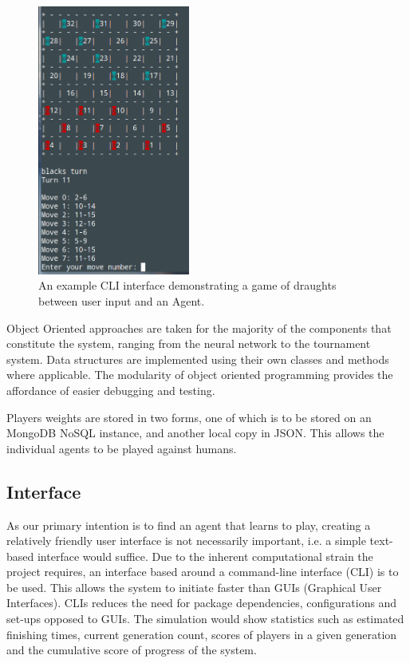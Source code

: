 \documentclass[12pt,a4paper]{article}
\begin{document}
    \begin{figure}
            \vspace{-30pt}
            \centering
            \caption{An example CLI interface demonstrating a game of draughts between user input and an Agent. \label{cli_human_input}}
            \includegraphics[width=50mm]{cli_humanvsagent.png}
            \vspace{-20pt}
        \end{figure}

    Object Oriented approaches are taken for the majority of the components that constitute the system, ranging from the neural network to the tournament system. Data structures are implemented using their own classes and methods where applicable. The modularity of object oriented programming provides the affordance of easier debugging and testing.

    Players weights are stored in two forms, one of which is to be stored on an MongoDB NoSQL instance, and another local copy in JSON. This allows the individual agents to be played against humans.


\subsection*{Interface}


    As our primary intention is to find an agent that learns to play, creating a relatively friendly user interface is not necessarily important, i.e. a simple text-based interface would suffice. Due to the inherent computational strain the project requires, an interface based around a command-line interface (CLI) is to be used. This allows the system to initiate faster than GUIs (Graphical User Interfaces). CLIs reduces the need for package dependencies, configurations and set-ups opposed to GUIs. The simulation would show statistics such as estimated finishing times, current generation count, scores of players in a given generation and the cumulative score of progress of the system.
\end{document}
